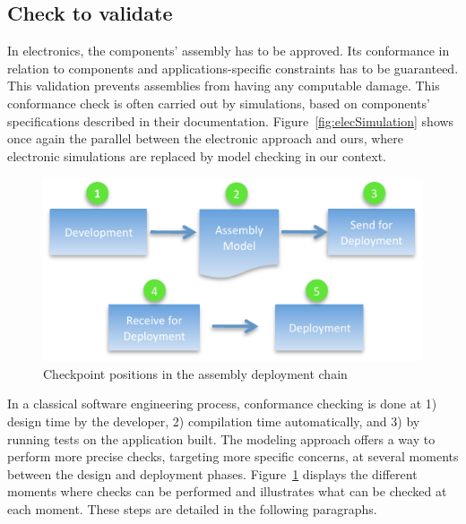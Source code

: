 \subsection{Check to validate}
\label{subsec:check_to_validate}

In electronics, the components' assembly has to be approved. Its conformance in relation to components and applications-specific constraints has to be guaranteed. This validation prevents assemblies from having any computable damage. This conformance check is often carried out by simulations, based on components' specifications described in their documentation. Figure~\ref{fig:elecSimulation} shows once again the parallel between the electronic approach and ours, where electronic simulations are replaced by model checking in our context.\\

\begin{figure}[h!]
\centering
\includegraphics[width=.8\textwidth]{part2/pics/CheckPositions.pdf}
\caption{Checkpoint positions in the assembly deployment chain}
\label{fig:checkPoints}
\end{figure}



In a classical software engineering process, conformance checking is done at 1) design time by the developer, 2) compilation time automatically, and 3) by running tests on the application built. The modeling approach offers a way to perform more precise checks, targeting more specific concerns, at several moments between the design and deployment phases. Figure~\ref{fig:checkPoints} displays the different moments where checks can be performed and illustrates what can be checked at each moment. These steps are detailed in the following paragraphs.

